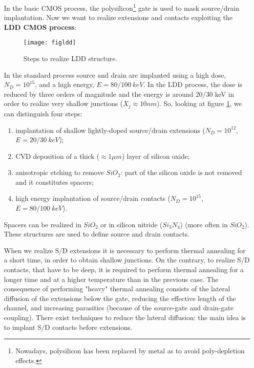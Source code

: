 \documentclass[a4paper, 12pt, twoside, openright]{report}
\begin{document}
In the basic CMOS process, the polysilicon\footnote{Nowadays, polysilicon has been replaced by metal as to avoid poly-depletion effects.} gate is used to mask source/drain implantation. Now we want to realize extensions and contacts exploiting the \textbf{LDD CMOS process}:

	\begin{figure}[H]
	\centering
	\texttt{[image: figldd]}
	\caption{Steps to realize LDD structure.}
	\label{LDD_process}
	\end{figure}

In the standard process source and drain are implanted using a high dose, $N_D = 10^{15}$, and a high energy, $E = 80/100\ keV$. In the LDD process, the dose is reduced by three orders of magnitude and the energy is around 20/30 keV in order to realize very shallow junctions ($X_j \approx 10 nm$). So, looking at figure \ref{LDD_process}, we can distinguish four steps:

\begin{enumerate}
\item implantation of shallow lightly-doped source/drain extensions ($N_D = 10^{12}$, $E = 20/30\ keV$);
\item CVD deposition of a thick ($\approx 1\mu m$) layer of silicon oxide;
\item anisotropic etching to remove $SiO_{2}$: part of the silicon oxide is not removed and it constitutes spacers;
\item high energy implantation of source/drain contacts ($N_D = 10^{15}$, $E = 80/100\ keV$).
\end{enumerate}

Spacers can be realized in $SiO_{2}$ or in silicon nitride ($Si_{3}N_{4}$) (more often in $SiO_{2}$). These structures are used to define source and drain contacts.

When we realize S/D extensions it is necessary to perform thermal annealing for a short time, in order to obtain shallow junctions. On the contrary, to realize S/D contacts, that have to be deep, it is required to perform thermal annealing for a longer time and at a higher temperature than in the previous case. The consequence of performing "heavy" thermal annealing consists of the lateral diffusion of the extensions below the gate, reducing the effective length of the channel, and increasing parasitics (because of the source-gate and drain-gate coupling). There exist techniques to reduce the lateral diffusion: the main idea is to implant S/D contacts before extensions.
\end{document}
